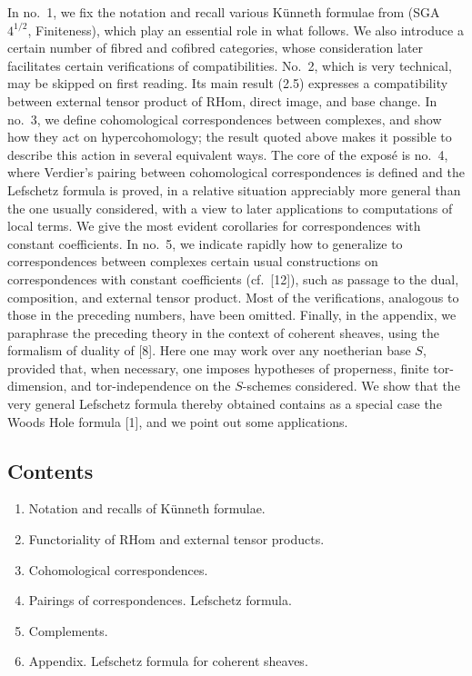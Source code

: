 \documentclass[11pt]{article}
\providecommand{\RHom}{\mathrm{RHom}}
\providecommand{\RHom}{\mathrm{RHom}}
\providecommand{\RHom}{\mathrm R\mathcal{H}om}
\providecommand{\RHom}{\mathrm{RHom}}
\begin{document}
In no.~1, we fix the notation and recall various Künneth formulae from (SGA~$4^{1/2}$, Finiteness), which play an essential role in what follows. We also introduce a certain number of fibred and cofibred categories, whose consideration later facilitates certain verifications of compatibilities. No.~2, which is very technical, may be skipped on first reading. Its main result (2.5) expresses a compatibility between external tensor product of $\RHom$, direct image, and base change. In no.~3, we define cohomological correspondences between complexes, and show how they act on hypercohomology; the result quoted above makes it possible to describe this action in several equivalent ways. The core of the exposé is no.~4, where Verdier's pairing between cohomological correspondences is defined and the Lefschetz formula is proved, in a relative situation appreciably more general than the one usually considered, with a view to later applications to computations of local terms. We give the most evident corollaries for correspondences with constant coefficients. In no.~5, we indicate rapidly how to generalize to correspondences between complexes certain usual constructions on correspondences with constant coefficients (cf.~[12]), such as passage to the dual, composition, and external tensor product. Most of the verifications, analogous to those in the preceding numbers, have been omitted. Finally, in the appendix, we paraphrase the preceding theory in the context of coherent sheaves, using the formalism of duality of [8]. Here one may work over any noetherian base $S$, provided that, when necessary, one imposes hypotheses of properness, finite tor-dimension, and tor-independence on the $S$-schemes considered. We show that the very general Lefschetz formula thereby obtained contains as a special case the Woods Hole formula [1], and we point out some applications.

\subsection*{Contents}
\begin{enumerate}[label=\arabic*.]
\item Notation and recalls of Künneth formulae.
\item Functoriality of $\RHom$ and external tensor products.
\item Cohomological correspondences.
\item Pairings of correspondences. Lefschetz formula.
\item Complements.
\item Appendix. Lefschetz formula for coherent sheaves.
\end{enumerate}
\end{document}
